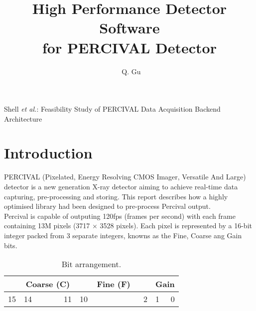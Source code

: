 \documentclass[journal]{IEEEtran}
\begin{document}
\title{High Performance Detector Software\\
for PERCIVAL Detector}

\author{~Q. Gu}

%
{Shell \MakeLowercase{\textit{et al.}}: Feasibility Study of PERCIVAL Data
Acquisition Backend Architecture}

\maketitle

\begin{abstract}

\end{abstract}

\section{Introduction}

 PERCIVAL\cite{wunderer2014percival} (Pixelated, Energy Resolving CMOS Imager, Versatile And Large) detector is a new generation X-ray detector aiming to achieve real-time data capturing, pre-processing and storing. This report describes how a highly optimised library had been designed to pre-process Percival output. \\ 
Percival is capable of outputing 120fps (frames per second) with each frame containing \texttildelow 13M pixels (3717 $\times$ 3528 pixels). Each pixel is represented by a 16-bit integer packed from 3 separate integers, knowns as the Fine, Coarse ang Gain bits. 

\begin{table}[h]
\centering
\label{bit_arrangement}
\begin{tabular}{r l c c c r l c c c c c c  r l r}
\hline
\multicolumn{1}{|c|}{} & 
\multicolumn{5}{|c|}{Coarse (C)} & 
\multicolumn{8}{|c|}{Fine (F)} &
\multicolumn{2}{|c|}{Gain} \\
\hline
 15 & 14 & & & & 11 & 10 & & & & & & & 2 & 1 & 0

\end{tabular}
\caption{Bit arrangement.}
\end{table}
\end{document}
